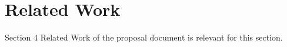\chapter{Related Work}

    \begin{todo}[Import]
		Section 4 Related Work of the proposal document is relevant for this section.
	\end{todo}